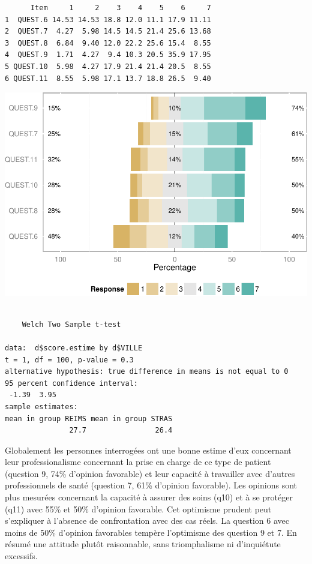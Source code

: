 \documentclass[]{article}
\begin{document}
\begin{verbatim}
      Item     1     2    3    4    5    6     7
1  QUEST.6 14.53 14.53 18.8 12.0 11.1 17.9 11.11
2  QUEST.7  4.27  5.98 14.5 14.5 21.4 25.6 13.68
3  QUEST.8  6.84  9.40 12.0 22.2 25.6 15.4  8.55
4  QUEST.9  1.71  4.27  9.4 10.3 20.5 35.9 17.95
5 QUEST.10  5.98  4.27 17.9 21.4 21.4 20.5  8.55
6 QUEST.11  8.55  5.98 17.1 13.7 18.8 26.5  9.40
\end{verbatim}

\includegraphics{analyse_files/figure-latex/unnamed-chunk-24-2.pdf}

\begin{verbatim}

    Welch Two Sample t-test

data:  d$score.estime by d$VILLE
t = 1, df = 100, p-value = 0.3
alternative hypothesis: true difference in means is not equal to 0
95 percent confidence interval:
 -1.39  3.95
sample estimates:
mean in group REIMS mean in group STRAS 
               27.7                26.4 
\end{verbatim}

Globalement les personnes interrogées ont une bonne estime d'eux
concernant leur professionalisme concernant la prise en charge de ce
type de patient (question 9, 74\% d'opinion favorable) et leur capacité
à travailler avec d'autres professionnels de santé (question 7, 61\%
d'opinion favorable). Les opinions sont plus mesurées concernant la
capacité à assurer des soins (q10) et à se protéger (q11) avec 55\% et
50\% d'opinion favorable. Cet optimisme prudent peut s'expliquer à
l'absence de confrontation avec des cas réels. La question 6 avec moins
de 50\% d'opinion favorables tempère l'optimisme des question 9 et 7. En
résumé une attitude plutôt raisonnable, sans triomphalisme ni
d'inquiétute excessifs.
\end{document}
